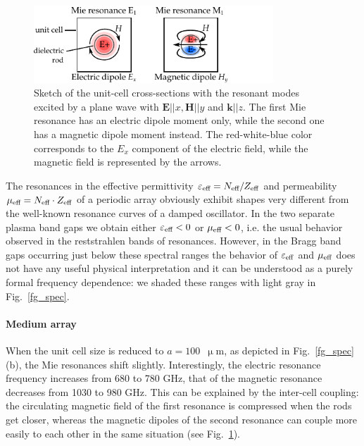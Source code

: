 \documentclass[letterpaper,12pt]{report}
\begin{document}
\begin{figure}[h]
\centering \includegraphics[width=9cm]{img/ERods_1st_and_2nd_Mie_resonance.pdf}
\caption{Sketch of the unit-cell
cross-sections with the resonant modes excited by a plane wave with $\mathbf{E}||x,
\mathbf{H}||y$ and $\mathbf{k}||z$. The first Mie resonance has an electric dipole moment
only, while the second one has a magnetic dipole moment instead. The red-white-blue color
corresponds to the $E_x$ component of the electric field, while the magnetic field is
represented by the arrows. }\label{fg_sketchfield}
\end{figure}

The resonances in the effective permittivity $\varepsilon_{\text{eff} }=N_{\text{eff} }/Z_{\text{eff} }$ and permeability $\mu_{\text{eff} }
= N_{\text{eff} }\cdot Z_{\text{eff} }$ of a periodic array obviously exhibit shapes very different from the
well-known resonance curves of a damped oscillator\cite{koschny2003resonant}. In the two
separate plasma band gaps we obtain either $\varepsilon_{\text{eff} } < 0$ or $\mu_{\text{eff} }<0$, i.e. the usual
behavior observed in the reststrahlen bands of resonances. However, in the Bragg band
gaps occurring just below these spectral ranges the behavior of $\varepsilon_{\text{eff} }$ and $\mu_{\text{eff} }$ does
not have any useful physical interpretation and it can be understood as a purely formal
frequency dependence: we shaded these ranges with light gray in Fig.~\ref{fg_spec}.

\paragraph{Medium array}
When the unit cell size is reduced to $a=100$~$\upmu$m, as depicted in
Fig.~\ref{fg_spec}(b), the Mie resonances shift slightly. Interestingly, the electric
resonance frequency increases from 680 to 780 GHz, that of the
magnetic resonance decreases from 1030 to 980 GHz. This can be explained by the
inter-cell coupling: the circulating magnetic field of the first resonance is compressed
when the rods get closer, whereas the magnetic dipoles of the second resonance can couple
more easily to each other in the same situation (see Fig.~\ref{fg_sketchfield}).
\end{document}
